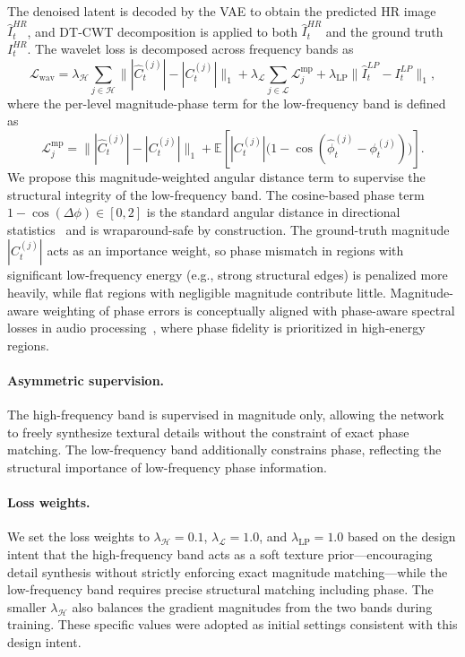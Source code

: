 The denoised latent is decoded by the VAE to obtain the predicted HR 
image $\hat{I}^{HR}_t$, and DT-CWT decomposition is applied to both 
$\hat{I}^{HR}_t$ and the ground truth $I^{HR}_t$. The wavelet loss 
is decomposed across frequency bands as
\begin{equation}
    \mathcal{L}_{\mathrm{wav}} 
    = \lambda_\mathcal{H} \!\sum_{j \in \mathcal{H}} \!
    \big\| |\hat{C}^{(j)}_t| - |C^{(j)}_t| \big\|_1
    + \lambda_\mathcal{L} \!\sum_{j \in \mathcal{L}} \!
    \mathcal{L}_j^{\mathrm{mp}}
    + \lambda_{\mathrm{LP}} \big\| \hat{I}^{LP}_t - I^{LP}_t \big\|_1,
    \label{eq:wav_loss}
\end{equation}
where the per-level magnitude-phase term for the low-frequency band 
is defined as
\begin{equation}
    \mathcal{L}_j^{\mathrm{mp}} = 
    \big\| |\hat{C}^{(j)}_t| - |C^{(j)}_t| \big\|_1 
    + \mathbb{E}\!\left[ |C^{(j)}_t| 
    \big(1 - \cos(\hat{\phi}^{(j)}_t - \phi^{(j)}_t)\big) \right].
    \label{eq:low_mp_loss}
\end{equation}
We propose this magnitude-weighted angular distance term to 
supervise the structural integrity of the low-frequency band. The 
cosine-based phase term $1 - \cos(\Delta\phi) \in [0, 2]$ is the 
standard angular distance in directional 
statistics~\cite{mardia2009directional} and is wraparound-safe by 
construction. The ground-truth magnitude $|C^{(j)}_t|$ acts as an 
importance weight, so phase mismatch in regions with significant 
low-frequency energy (e.g., strong structural edges) is penalized 
more heavily, while flat regions with negligible magnitude 
contribute little. Magnitude-aware weighting of phase errors is 
conceptually aligned with phase-aware spectral losses in audio 
processing~\cite{choi2019phaseaware}, where phase fidelity is 
prioritized in high-energy regions.

\paragraph{Asymmetric supervision.}
The high-frequency band is supervised in magnitude only, allowing 
the network to freely synthesize textural details without the 
constraint of exact phase matching. The low-frequency band 
additionally constrains phase, reflecting the structural importance 
of low-frequency phase information.

\paragraph{Loss weights.}
We set the loss weights to $\lambda_\mathcal{H} = 0.1$, 
$\lambda_\mathcal{L} = 1.0$, and $\lambda_{\mathrm{LP}} = 1.0$ 
based on the design intent that the high-frequency band acts as a 
soft texture prior---encouraging detail synthesis without strictly 
enforcing exact magnitude matching---while the low-frequency band 
requires precise structural matching including phase. The smaller 
$\lambda_\mathcal{H}$ also balances the gradient magnitudes from 
the two bands during training. These specific values were adopted 
as initial settings consistent with this design intent.


